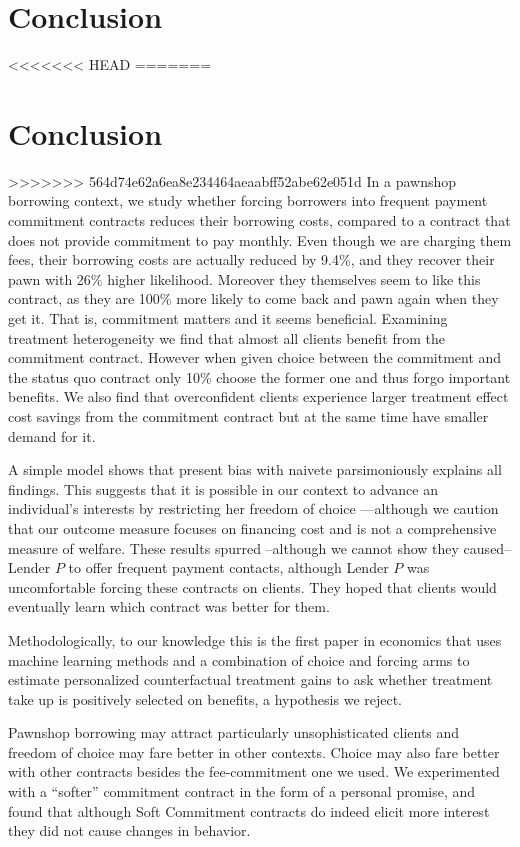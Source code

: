 \documentclass[oneside,11pt]{article}
\begin{document}
{    
\section{Conclusion} \label{conclusion}

<<<<<<< HEAD
=======
    
\section{Conclusion} \label{conclusion}

>>>>>>> 564d74e62a6ea8e234464aeaabff52abe62e051d
In a pawnshop borrowing context, we study whether forcing borrowers into frequent payment commitment contracts reduces their borrowing costs, compared to a contract that does not provide commitment to pay monthly. Even though we are charging them fees, their borrowing costs are actually reduced by 9.4\%, and they recover their pawn with 26\% higher likelihood. Moreover they themselves seem to like this contract, as they are 100\% more likely to come back and pawn again when they get it. That is, commitment matters and it seems beneficial. Examining treatment heterogeneity we find that almost all clients benefit from the commitment contract. However when given choice between the commitment and the status quo contract only 10\% choose the former one and thus forgo important benefits. We also find that overconfident clients experience larger treatment effect cost savings from the commitment contract but at the same time have smaller demand for it. 

A simple model shows that present bias with naivete parsimoniously explains all findings. This suggests that it is possible in our context to advance an individual's interests by restricting her freedom of choice ---although we caution that our outcome measure focuses on financing cost and is not a comprehensive measure of welfare. These results spurred --although we cannot show they caused-- Lender $P$ to offer frequent payment contacts, although Lender $P$ was uncomfortable forcing these contracts on clients. They hoped that clients would eventually learn which contract was better for them.

Methodologically, to our knowledge this is the first paper in economics that uses machine learning methods and a combination of choice and forcing arms to estimate personalized counterfactual treatment gains to ask whether treatment take up is positively selected on benefits, a hypothesis we reject.

Pawnshop borrowing may attract particularly unsophisticated clients and freedom of choice may fare better in other contexts. Choice may also fare better with other contracts besides the fee-commitment one we used. We experimented with a ``softer'' commitment contract in the form of a personal promise, and found that although Soft Commitment contracts do indeed elicit more interest they did not cause changes in behavior. 

}
\end{document}
